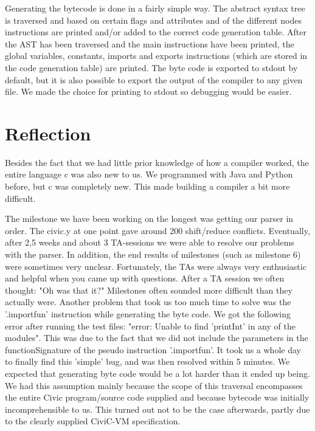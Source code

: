 \documentclass[hidelinks]{uva-inf-article}
\begin{document}
\par Generating the bytecode is done in a fairly simple way.
The abstract syntax tree is traversed and based on certain flags and attributes and of the different 
nodes instructions are printed and/or added to the correct code generation table.
After the AST has been traversed and the main instructions have been printed, the global variables, constants, 
imports and exports instructions (which are stored in the code generation table) are printed.
The byte code is exported to stdout by default, but it is also possible to export the output of the compiler to any given file.
We made the choice for printing to stdout so debugging would be easier. 

\newpage
\section{Reflection}
\par Besides the fact that we had little prior knowledge of how a compiler worked, the entire language c was also new to us.
We programmed with Java and Python before, but c was completely new. This made building a compiler a bit more difficult.

The milestone we have been working on the longest was getting our parser in order.
The civic.y at one point gave around 200 shift/reduce conflicts. Eventually, after 2,5 weeks and about 3 TA-sessions we were able to resolve our problems with the parser.
In addition, the end results of milestones (such as milestone 6) were sometimes very unclear. Fortunately, the TAs were always very enthusiastic and helpful when you came up with questions. 
After a TA session we often thought: "Oh was that it?" Milestones often sounded more difficult than they actually were.
Another problem that took us too much time to solve was the '.importfun' instruction while generating the byte code. 
We got the following error after running the test files: "error: Unable to find 'printInt' in any of the modules". 
This was due to the fact that we did not include the parameters in the functionSignature of the pseudo instruction '.importfun'. 
It took us a whole day to finally find this 'simple' bug, and was then resolved within 5 minutes.
We expected that generating byte code would be a lot harder than it ended up being. 
We had this assumption mainly because the scope of this traversal encompasses the entire Civic program/source code supplied and because bytecode was initially 
incomprehensible to us. This turned out not to be the case afterwards, partly due to the clearly supplied CiviC-VM specification.
\end{document}
